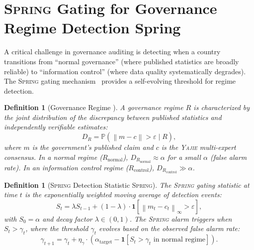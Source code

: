 \documentclass[11pt,a4paper]{article}
\newtheorem{definition}[theorem]{Definition}
\theoremstyle{definition}
\newcommand{\Yajie}{\textsc{Yajie}}
\newcommand{\Spring}{\textsc{Spring}}
\newcommand{\ind}[1]{\mathbf{1}[#1]}
\newcommand{\norm}[1]{\left\lVert#1\right\rVert}
\begin{document}
\section{\Spring{} Gating for Governance Regime Detection Spring}
\label{sec:spring}
A critical challenge in governance auditing is detecting when a country transitions from ``normal governance'' (where published statistics are broadly reliable) to ``information control'' (where data quality systematically degrades). The \Spring{} gating mechanism~\cite{SCX2025} provides a self-evolving threshold for regime detection.
\begin{definition}[Governance Regime ]
\label{def:gov_regime}
A governance regime $R$ is characterized by the joint distribution of the discrepancy between published statistics and independently verifiable estimates:
\begin{equation}
    D_R = \mathbb{P}(\norm{m - c} > \varepsilon \mid R),
    \label{eq:regime_dist}
\end{equation}
where $m$ is the government's published claim and $c$ is the \Yajie{} multi-expert consensus. In a normal regime ($R_{\mathrm{normal}}$), $D_{R_{\mathrm{normal}}} \approx \alpha$ for a small $\alpha$ (false alarm rate). In an information control regime ($R_{\mathrm{control}}$), $D_{R_{\mathrm{control}}} \gg \alpha$.
\end{definition}
\begin{definition}[\Spring{} Detection Statistic \Spring{}]
\label{def:spring_stat}
The \Spring{} gating statistic at time $t$ is the exponentially weighted moving average of detection events:
\begin{equation}
    S_t = \lambda S_{t-1} + (1 - \lambda) \cdot \ind{\norm{m_t - c_t}_\infty > \varepsilon},
    \label{eq:spring_stat}
\end{equation}
with $S_0 = \alpha$ and decay factor $\lambda \in (0, 1)$. The \Spring{} alarm triggers when $S_t > \gamma_t$, where the threshold $\gamma_t$ evolves based on the observed false alarm rate:
\begin{equation}
    \gamma_{t+1} = \gamma_t + \eta_\gamma \cdot (\alpha_{\mathrm{target}} - \ind{S_t > \gamma_t \text{ in normal regime}}).
    \label{eq:spring_threshold}
\end{equation}
\end{definition}
\end{document}
